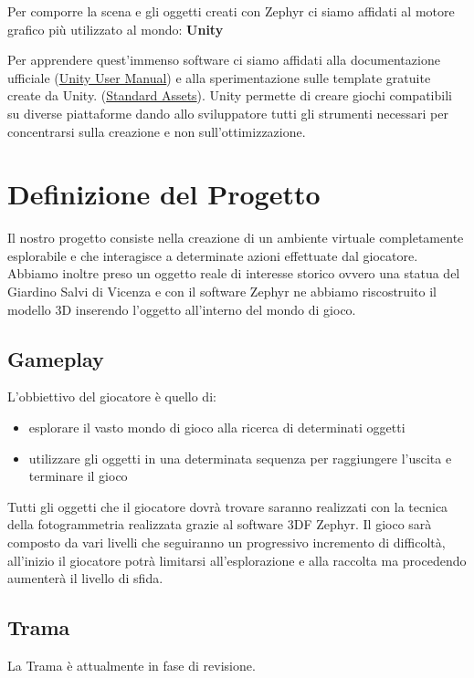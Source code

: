 \documentclass[12pt]{report}
\begin{document}
Per comporre la scena e gli oggetti creati con Zephyr ci siamo affidati al motore grafico pi\`u utilizzato al mondo: \textbf{Unity}

Per apprendere quest'immenso software ci siamo affidati alla documentazione ufficiale (\href{https://docs.unity3d.com/Manual/index.html}{Unity User Manual}) e alla sperimentazione sulle template gratuite create da Unity. (\href{https://assetstore.unity.com/packages/essentials/asset-packs/standard-assets-32351}{Standard Assets}).
Unity permette di creare giochi compatibili su diverse piattaforme dando allo sviluppatore tutti gli strumenti necessari per concentrarsi sulla creazione e non sull'ottimizzazione.

\newpage
\section{Definizione del Progetto}

Il nostro progetto consiste nella creazione di un ambiente virtuale completamente esplorabile e che interagisce a determinate azioni effettuate dal giocatore. Abbiamo inoltre preso un oggetto reale di interesse storico ovvero una statua del Giardino Salvi di Vicenza e con il software Zephyr ne abbiamo riscostruito il modello 3D inserendo l'oggetto all'interno del mondo di gioco.

\subsection{Gameplay}
L'obbiettivo del giocatore \`e quello di:
\begin{itemize}
\item esplorare il vasto mondo di gioco alla ricerca di determinati oggetti
\item utilizzare gli oggetti in una determinata sequenza per raggiungere l'uscita e terminare il gioco
\end{itemize} 

Tutti gli oggetti che il giocatore dovr\`a trovare saranno realizzati con la tecnica della fotogrammetria realizzata grazie al software 3DF Zephyr. 
Il gioco sar\`a composto da vari livelli che seguiranno un progressivo incremento di difficolt\`a, all'inizio il giocatore potr\`a limitarsi all'esplorazione e alla raccolta ma procedendo aumenter\`a il livello di sfida.

\newpage
\subsection{Trama}
La Trama è attualmente in fase di revisione.
\end{document}
